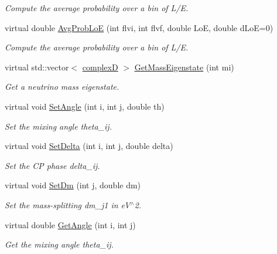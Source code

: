 \begin{DoxyCompactItemize}
\begin{DoxyCompactList}\small\item\em Compute the average probability over a bin of L/E. \end{DoxyCompactList}\item 
virtual double \hyperlink{classOscProb_1_1PMNS__Base_ac19a92f4ef428a7333ca8eed76fca637}{Avg\+Prob\+LoE} (int flvi, int flvf, double LoE, double d\+LoE=0)
\begin{DoxyCompactList}\small\item\em Compute the average probability over a bin of L/E. \end{DoxyCompactList}\item 
virtual std\+::vector$<$ \hyperlink{EigenPoint_8h_a67ca8e107e20610c3fff78d5e726ece0}{complexD} $>$ \hyperlink{classOscProb_1_1PMNS__Base_a5092561dd8579d390c649eb60803ea98}{Get\+Mass\+Eigenstate} (int mi)
\begin{DoxyCompactList}\small\item\em Get a neutrino mass eigenstate. \end{DoxyCompactList}\item 
virtual void \hyperlink{classOscProb_1_1PMNS__Base_ace7875cf6d3bec161a2b7ed2690aec34}{Set\+Angle} (int i, int j, double th)
\begin{DoxyCompactList}\small\item\em Set the mixing angle theta\+\_\+ij. \end{DoxyCompactList}\item 
virtual void \hyperlink{classOscProb_1_1PMNS__Base_a4bef78cfcfc4e70b4ce79cdb8862c0a3}{Set\+Delta} (int i, int j, double delta)
\begin{DoxyCompactList}\small\item\em Set the CP phase delta\+\_\+ij. \end{DoxyCompactList}\item 
virtual void \hyperlink{classOscProb_1_1PMNS__Base_a492243b22fb1b783cd2943f507cff970}{Set\+Dm} (int j, double dm)
\begin{DoxyCompactList}\small\item\em Set the mass-\/splitting dm\+\_\+j1 in e\+V$^\wedge$2. \end{DoxyCompactList}\item 
virtual double \hyperlink{classOscProb_1_1PMNS__Base_acee137091304c919642293ddf015bbc8}{Get\+Angle} (int i, int j)
\begin{DoxyCompactList}\small\item\em Get the mixing angle theta\+\_\+ij. \end{DoxyCompactList}\item 

\end{DoxyCompactItemize}
